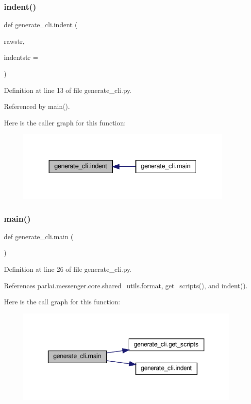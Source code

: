 \subsubsection{\texorpdfstring{indent()}{indent()}}
{\footnotesize\ttfamily def generate\+\_\+cli.\+indent (\begin{DoxyParamCaption}\item[{}]{rawstr,  }\item[{}]{indentstr = {\ttfamily \textquotesingle{}~~~~\textquotesingle{}} }\end{DoxyParamCaption})}



Definition at line 13 of file generate\+\_\+cli.\+py.



Referenced by main().

Here is the caller graph for this function\+:
\nopagebreak
\begin{figure}[H]
\begin{center}
\leavevmode
\includegraphics[width=307pt]{namespacegenerate__cli_a398461fabd4559f4d4d041df98c8cb43_icgraph}
\end{center}
\end{figure}
\mbox{\label{namespacegenerate__cli_ac2397b33242e0f40a20f33a2ea5beebf}} 
\subsubsection{\texorpdfstring{main()}{main()}}
{\footnotesize\ttfamily def generate\+\_\+cli.\+main (\begin{DoxyParamCaption}{ }\end{DoxyParamCaption})}



Definition at line 26 of file generate\+\_\+cli.\+py.



References parlai.\+messenger.\+core.\+shared\+\_\+utils.\+format, get\+\_\+scripts(), and indent().

Here is the call graph for this function\+:
\nopagebreak
\begin{figure}[H]
\begin{center}
\leavevmode
\includegraphics[width=329pt]{namespacegenerate__cli_ac2397b33242e0f40a20f33a2ea5beebf_cgraph}
\end{center}
\end{figure}
